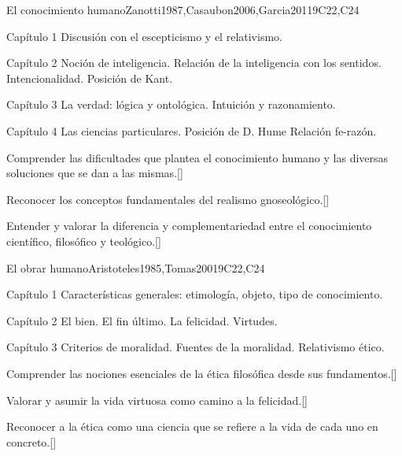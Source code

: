 \begin{syllabus}
\begin{unit}{}{El conocimiento humano}{Zanotti1987,Casaubon2006,Garcia2011}{9}{C22,C24}
\begin{topics}
	\item Capítulo 1
		\subitem Discusión con el escepticismo y el relativismo.
	\item Capítulo 2
		\subitem Noción de inteligencia.
		\subitem Relación de la inteligencia con los sentidos. 
		\subitem Intencionalidad. 
		\subitem Posición de Kant.
	\item Capítulo 3
		\subitem La verdad: lógica y ontológica.
		\subitem Intuición y razonamiento.
	\item Capítulo 4
		\subitem Las ciencias particulares. 
		\subitem Posición de D. Hume
		\subitem Relación fe-razón.
\end{topics}

\begin{learningoutcomes}
	\item Comprender las dificultades que plantea el conocimiento humano y las diversas soluciones que se dan a las mismas.[\Familiarity]
	\item Reconocer los conceptos fundamentales del realismo gnoseológico.[\Familiarity]
	\item Entender y valorar la diferencia y complementariedad entre el conocimiento científico, filosófico y teológico.[\Familiarity]
\end{learningoutcomes}
\end{unit}

\begin{unit}{}{El obrar humano}{Aristoteles1985,Tomas2001}{9}{C22,C24}
\begin{topics}
	\item Capítulo 1
		\subitem Características generales: etimología, objeto, tipo de conocimiento.
	\item Capítulo 2
		\subitem El bien. El fin último. La felicidad.
		\subitem Virtudes.
	\item Capítulo 3
		\subitem Criterios de moralidad.
		\subitem Fuentes de la moralidad.
		\subitem Relativismo ético.
\end{topics}

\begin{learningoutcomes}
	\item Comprender las nociones esenciales de la ética filosófica desde sus fundamentos.[\Familiarity	]
	\item Valorar y asumir la vida virtuosa como camino a la felicidad.[\Familiarity]
	\item Reconocer a la ética como una ciencia que se refiere a la vida de cada uno en concreto.[\Familiarity]
\end{learningoutcomes}
\end{unit}


\end{syllabus}
